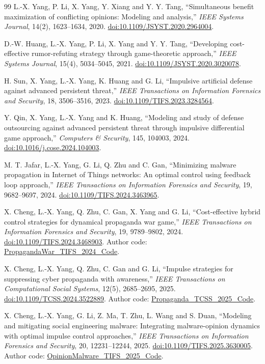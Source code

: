 \documentclass[11pt,a4paper]{article}
\theoremstyle{definition}
\theoremstyle{remark}
\begin{document}
\begin{thebibliography}{99}
 L.-X. Yang, P. Li, X. Yang, Y. Xiang and Y. Y. Tang, ``Simultaneous benefit maximization of conflicting opinions: Modeling and analysis,'' \emph{IEEE Systems Journal}, 14(2), 1623--1634, 2020. \href{https://doi.org/10.1109/JSYST.2020.2964004}{doi:10.1109/JSYST.2020.2964004}.

 D.-W. Huang, L.-X. Yang, P. Li, X. Yang and Y. Y. Tang, ``Developing cost-effective rumor-refuting strategy through game-theoretic approach,'' \emph{IEEE Systems Journal}, 15(4), 5034--5045, 2021. \href{https://doi.org/10.1109/JSYST.2020.3020078}{doi:10.1109/JSYST.2020.3020078}.

 H. Sun, X. Yang, L.-X. Yang, K. Huang and G. Li, ``Impulsive artificial defense against advanced persistent threat,'' \emph{IEEE Transactions on Information Forensics and Security}, 18, 3506--3516, 2023. \href{https://doi.org/10.1109/TIFS.2023.3284564}{doi:10.1109/TIFS.2023.3284564}.

 Y. Qin, X. Yang, L.-X. Yang and K. Huang, ``Modeling and study of defense outsourcing against advanced persistent threat through impulsive differential game approach,'' \emph{Computers \& Security}, 145, 104003, 2024. \href{https://doi.org/10.1016/j.cose.2024.104003}{doi:10.1016/j.cose.2024.104003}.

 M. T. Jafar, L.-X. Yang, G. Li, Q. Zhu and C. Gan, ``Minimizing malware propagation in Internet of Things networks: An optimal control using feedback loop approach,'' \emph{IEEE Transactions on Information Forensics and Security}, 19, 9682--9697, 2024. \href{https://doi.org/10.1109/TIFS.2024.3463965}{doi:10.1109/TIFS.2024.3463965}.

 X. Cheng, L.-X. Yang, Q. Zhu, C. Gan, X. Yang and G. Li, ``Cost-effective hybrid control strategies for dynamical propaganda war game,'' \emph{IEEE Transactions on Information Forensics and Security}, 19, 9789--9802, 2024. \href{https://doi.org/10.1109/TIFS.2024.3468903}{doi:10.1109/TIFS.2024.3468903}. Author code: \href{https://github.com/XiaojuanCheng/PropagandaWar_TIFS_2024_Code}{PropagandaWar\_TIFS\_2024\_Code}.

 X. Cheng, L.-X. Yang, Q. Zhu, C. Gan and G. Li, ``Impulse strategies for suppressing cyber propaganda with awareness,'' \emph{IEEE Transactions on Computational Social Systems}, 12(5), 2685--2695, 2025. \href{https://doi.org/10.1109/TCSS.2024.3522889}{doi:10.1109/TCSS.2024.3522889}. Author code: \href{https://github.com/XiaojuanCheng/Propaganda_TCSS_2025_Code}{Propaganda\_TCSS\_2025\_Code}.

 X. Cheng, L.-X. Yang, G. Li, Z. Ma, T. Zhu, L. Wang and S. Duan, ``Modeling and mitigating social engineering malware: Integrating malware-opinion dynamics with optimal impulse control approaches,'' \emph{IEEE Transactions on Information Forensics and Security}, 20, 12231--12244, 2025. \href{https://doi.org/10.1109/TIFS.2025.3630005}{doi:10.1109/TIFS.2025.3630005}. Author code: \href{https://github.com/XiaojuanCheng/OpinionMalware_TIFS_2025_Code}{OpinionMalware\_TIFS\_2025\_Code}.
\end{thebibliography}
\end{document}
